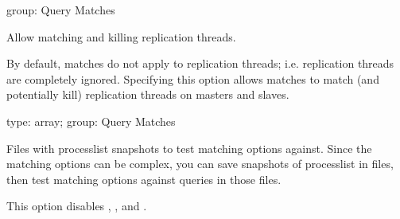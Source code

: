\documentclass[letterpaper,10pt,english]{sphinxmanual}
\begin{document}
\begin{fulllineitems}
\label{\detokenize{mariadb-kill:cmdoption-mariadb-kill-replication-threads}}
group: Query Matches

Allow matching and killing replication threads.

By default, matches do not apply to replication threads; i.e. replication
threads are completely ignored.  Specifying this option allows matches to
match (and potentially kill) replication threads on masters and slaves.

\end{fulllineitems}


\begin{fulllineitems}
\label{\detokenize{mariadb-kill:cmdoption-mariadb-kill-test-matching}}
type: array; group: Query Matches

Files with processlist snapshots to test matching options against.  Since
the matching options can be complex, you can save snapshots of processlist
in files, then test matching options against queries in those files.

This option disables {\hyperref[\detokenize{mariadb-kill:cmdoption-mariadb-kill-run-time}]{}}, {\hyperref[\detokenize{mariadb-kill:cmdoption-mariadb-kill-interval}]{}},
and {\hyperref[\detokenize{mariadb-kill:cmdoption-mariadb-kill-no-ignore-self}]{}}.

\end{fulllineitems}
\end{document}
